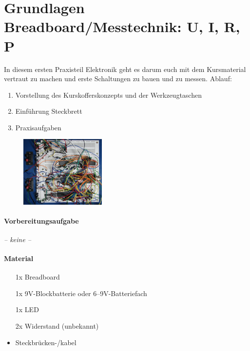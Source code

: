 
\clearpage

\section{Grundlagen Breadboard/Messtechnik: U, I, R, P}

In diesem ersten Praxisteil Elektronik geht es darum euch mit dem Kursmaterial
vertraut zu machen und erste Schaltungen zu bauen und zu messen. Ablauf:

\begin{enumerate}
  \item Vorstellung des Kurskofferskonzepts und der Werkzeugtaschen
  \item Einführung Steckbrett
  \item Praxisaufgaben
\end{enumerate}

{
  \begin{figure}
    \includegraphics[width=0.38\textwidth]{Breadboard_complex.jpg}
  \end{figure}

  \paragraph{Vorbereitungsaufgabe}

  \emph{-- keine --}


  \paragraph{Material}

  \begin{itemize}
    \item[1x] Breadboard
    \item[1x] 9V-Blockbatterie oder 6--9V-Batteriefach
    \item[1x] LED
    \item[2x] Widerstand (unbekannt) 
    \item Steckbrücken-/kabel
  \end{itemize}
}

